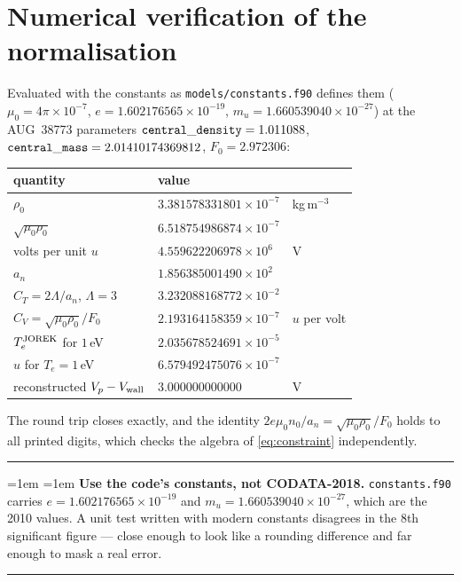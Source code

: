 \documentclass[11pt,a4paper]{article}
\newcommand{\code}[1]{\texttt{\small #1}}
\newenvironment{keybox}{\par\medskip\noindent\rule{\linewidth}{0.4pt}\par\smallskip%
\leftskip=1em \rightskip=1em\relax}{\par\smallskip\leftskip=0pt \rightskip=0pt\noindent\rule{\linewidth}{0.4pt}\par\medskip}
\begin{document}
\section{Numerical verification of the normalisation}

Evaluated with the constants as \code{models/constants.f90} defines them
($\mu_0=4\pi\times10^{-7}$, $e=1.602176565\times10^{-19}$,
$m_u=1.660539040\times10^{-27}$) at the AUG~38773 parameters
${\tt central\_density}=1.011088$, ${\tt central\_mass}=2.01410174369812$, $F_0=2.972306$:

\begin{center}\small
\begin{tabular}{lll}
\toprule
quantity & value & \\
\midrule
$\rho_0$                        & $3.381578331801\times10^{-7}$ & kg\,m$^{-3}$\\
$\sqrt{\mu_0\rho_0}$            & $6.518754986874\times10^{-7}$ & \\
volts per unit $u$              & $4.559622206978\times10^{6}$  & V\\
$a_n$                           & $1.856385001490\times10^{2}$  & \\
$C_T=2\Lambda/a_n$, $\Lambda=3$ & $3.232088168772\times10^{-2}$ & \\
$C_V=\sqrt{\mu_0\rho_0}/F_0$    & $2.193164158359\times10^{-7}$ & $u$ per volt\\
$T_e^{\rm JOREK}$ for $1$\,eV   & $2.035678524691\times10^{-5}$ & \\
$u$ for $T_e=1$\,eV             & $6.579492475076\times10^{-7}$ & \\
\midrule
reconstructed $V_p-V_{\rm wall}$ & $3.000000000000$ & V \\
\bottomrule
\end{tabular}
\end{center}

The round trip closes exactly, and the identity $2e\mu_0n_0/a_n=\sqrt{\mu_0\rho_0}/F_0$ holds to
all printed digits, which checks the algebra of \eqref{eq:constraint} independently.

\begin{keybox}
\textbf{Use the code's constants, not CODATA-2018.} \code{constants.f90} carries
$e=1.602176565\times10^{-19}$ and $m_u=1.660539040\times10^{-27}$, which are the 2010 values. A
unit test written with modern constants disagrees in the 8th significant figure --- close enough to
look like a rounding difference and far enough to mask a real error.
\end{keybox}
\end{document}
